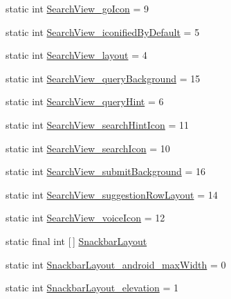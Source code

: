 \begin{DoxyCompactItemize}
\item 
static int \hyperlink{classandroid_1_1support_1_1design_1_1R_1_1styleable_a1ce6776217e2c2e3d29ecc0a70889b21}{Search\+View\+\_\+go\+Icon} = 9
\item 
static int \hyperlink{classandroid_1_1support_1_1design_1_1R_1_1styleable_a885ff4567a9e9b0a2f61d08d2b7e4a7d}{Search\+View\+\_\+iconified\+By\+Default} = 5
\item 
static int \hyperlink{classandroid_1_1support_1_1design_1_1R_1_1styleable_a508458355c8e4fb9a6661d806c0ec352}{Search\+View\+\_\+layout} = 4
\item 
static int \hyperlink{classandroid_1_1support_1_1design_1_1R_1_1styleable_a625f77d9f60563036744e0de3279d85b}{Search\+View\+\_\+query\+Background} = 15
\item 
static int \hyperlink{classandroid_1_1support_1_1design_1_1R_1_1styleable_a879468cbbd5600253d62fe8000d05975}{Search\+View\+\_\+query\+Hint} = 6
\item 
static int \hyperlink{classandroid_1_1support_1_1design_1_1R_1_1styleable_a9c896f5dd793d57c75958116ba69b26c}{Search\+View\+\_\+search\+Hint\+Icon} = 11
\item 
static int \hyperlink{classandroid_1_1support_1_1design_1_1R_1_1styleable_a4261289fdaf3e932d53a3c70b119b5bf}{Search\+View\+\_\+search\+Icon} = 10
\item 
static int \hyperlink{classandroid_1_1support_1_1design_1_1R_1_1styleable_accdf4bff313010f9ca3ee8384626b8cb}{Search\+View\+\_\+submit\+Background} = 16
\item 
static int \hyperlink{classandroid_1_1support_1_1design_1_1R_1_1styleable_aa9bcaf27bf978930d50357c99f8abada}{Search\+View\+\_\+suggestion\+Row\+Layout} = 14
\item 
static int \hyperlink{classandroid_1_1support_1_1design_1_1R_1_1styleable_ab8427471179b0f69c665ef59d850bd39}{Search\+View\+\_\+voice\+Icon} = 12
\item 
static final int \mbox{[}$\,$\mbox{]} \hyperlink{classandroid_1_1support_1_1design_1_1R_1_1styleable_ade77d86fa8e689770b5436467abdc2db}{Snackbar\+Layout}
\item 
static int \hyperlink{classandroid_1_1support_1_1design_1_1R_1_1styleable_a402146713ec6bfdca0ad3ae02e6731fe}{Snackbar\+Layout\+\_\+android\+\_\+max\+Width} = 0
\item 
static int \hyperlink{classandroid_1_1support_1_1design_1_1R_1_1styleable_ab3ccaab6fd75451ae24c27558c096f8a}{Snackbar\+Layout\+\_\+elevation} = 1
\item 

\end{DoxyCompactItemize}
